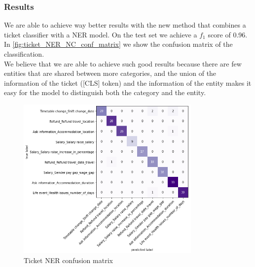 \subsubsection*{Results}
We are able to achieve way better results with the new method that combines a ticket classifier with a NER model. On the test set we achieve a $f_1$ score of 0.96. \\
In \autoref{fig:ticket_NER_NC_conf_matrix} we show the confusion matrix of the classification. \\
We believe that we are able to achieve such good results because there are few entities that are shared between more categories, and the union of the information of the ticket ([CLS] token) and the information of the entity makes it easy for the model to distinguish both the category and the entity.
\begin{figure}[h] 
    \centering
    \includegraphics[width=0.8\textwidth]{images/conf_matrix_ner_nc.png}
    \caption{Ticket NER confusion matrix}
    \label{fig:ticket_NER_NC_conf_matrix}
\end{figure}   
